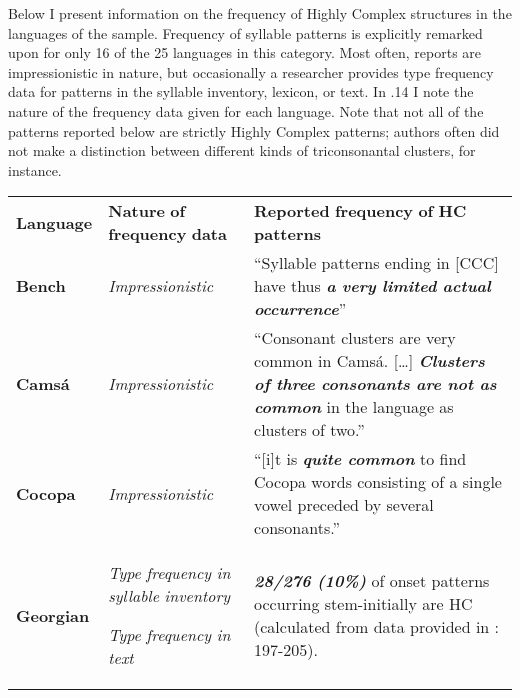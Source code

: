   Below I present information on the frequency of Highly Complex structures in the languages of the sample. Frequency of syllable patterns is explicitly remarked upon for only 16 of the 25 languages in this category. Most often, reports are impressionistic in nature, but occasionally a researcher provides type frequency data for patterns in the syllable inventory, lexicon, or text. In .14 I note the nature of the frequency data given for each language. Note that not all of the patterns reported below are strictly Highly Complex patterns; authors often did not make a distinction between different kinds of triconsonantal clusters, for instance.






\begin{table}
\begin{tabularx}{\textwidth}{XXX}
\lsptoprule

\textbf{Language} & \textbf{Nature} \textbf{of} \textbf{frequency} \textbf{data} & \textbf{Reported} \textbf{frequency} \textbf{of} \textbf{HC} \textbf{patterns}\\
{\bfseries Bench} & \textit{Impressionistic} & “Syllable patterns ending in [CCC] have thus \textbf{\textit{a} \textit{very} \textit{limited} \textit{actual} \textit{occurrence}}” \citep[92]{Rapold2006}\\
{\bfseries Camsá} & \textit{Impressionistic} & “Consonant clusters are very common in Camsá.\textbf{ }[…] \textbf{\textit{Clusters} \textit{of} \textit{three} \textit{consonants} \textit{are} \textit{not} \textit{as} \textit{common} }in the language as clusters of two.” \citep[81-4]{Howard1967}\\
\textbf{Cocopa} & \textit{Impressionistic} & “[i]t is \textbf{\textit{quite} \textit{common}} to find Cocopa words consisting of a single vowel preceded by several consonants.” \citep[1]{Bendixen1980}\\
\textbf{Georgian} & \textit{Type} \textit{frequency} \textit{in} \textit{syllable} \textit{inventory}

\textit{Type} \textit{frequency} \textit{in} \textit{text} & \textbf{\textit{28/276} \textit{(10\%)} }of onset patterns occurring stem-initially are HC (calculated from data provided in \citealt{Butskhrikidze2002}: 197-205).


\end{tabularx}
\end{table}
